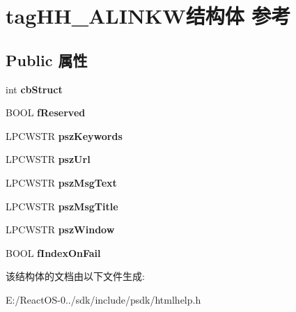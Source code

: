 \hypertarget{structtag_h_h___a_l_i_n_k_w}{}\section{tag\+H\+H\+\_\+\+A\+L\+I\+N\+K\+W结构体 参考}
\label{structtag_h_h___a_l_i_n_k_w}
\subsection*{Public 属性}
\begin{DoxyCompactItemize}
\item 
\mbox{\label{structtag_h_h___a_l_i_n_k_w_a36b45a1702f195e36ccf21f7e4699222}} 
int {\bfseries cb\+Struct}
\item 
\mbox{\label{structtag_h_h___a_l_i_n_k_w_ad338926f2336eca44266a00f6ff352a9}} 
B\+O\+OL {\bfseries f\+Reserved}
\item 
\mbox{\label{structtag_h_h___a_l_i_n_k_w_a39c86968cfd51b678a9cb39cc3dc2b7c}} 
L\+P\+C\+W\+S\+TR {\bfseries psz\+Keywords}
\item 
\mbox{\label{structtag_h_h___a_l_i_n_k_w_a1c9ffa7ab6e7bb7045831913f7e1aa85}} 
L\+P\+C\+W\+S\+TR {\bfseries psz\+Url}
\item 
\mbox{\label{structtag_h_h___a_l_i_n_k_w_a6f980fc3156d92ee00bc65fb332e24d4}} 
L\+P\+C\+W\+S\+TR {\bfseries psz\+Msg\+Text}
\item 
\mbox{\label{structtag_h_h___a_l_i_n_k_w_ab01d75343282820b841aa9d18833bff2}} 
L\+P\+C\+W\+S\+TR {\bfseries psz\+Msg\+Title}
\item 
\mbox{\label{structtag_h_h___a_l_i_n_k_w_a65fa1aa74cc1e8fb237bf5ca41695d7d}} 
L\+P\+C\+W\+S\+TR {\bfseries psz\+Window}
\item 
\mbox{\label{structtag_h_h___a_l_i_n_k_w_a4aaaec226edcb4715fd42d70ee053e01}} 
B\+O\+OL {\bfseries f\+Index\+On\+Fail}
\end{DoxyCompactItemize}


该结构体的文档由以下文件生成\+:\begin{DoxyCompactItemize}
\item 
E\+:/\+React\+O\+S-\/0../sdk/include/psdk/htmlhelp.\+h\end{DoxyCompactItemize}
